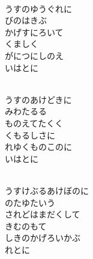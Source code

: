 \documentclass[10pt,b5j]{tarticle} %
\begin{document}
\vspace{1.5em} %
\newcommand{\linespace}{0.5em} %
\newcommand{\blocksize}{0.33\hsize} %
\newcommand{\itemmargin}{3em} %
\begin{enumerate} %
    \setlength{\itemindent}{\itemmargin} %
    \begin{minipage}[c]{\blocksize}
    
        \vspace{\linespace}
        \item~\\
        うすのゆうぐれに\\
        びのはきぶ\\
        かげすにろいて\\
        くましく\\
        がにつにしのえ\\
        いはとに
        
        \vspace{\linespace}
        \item~\\
        うすのあけどきに\\
        みわたるる\\
        ものえてたくく\\
        くもるしさに\\
        れゆくものこのに\\
        いはとに
        
    \end{minipage}
    \begin{minipage}[c]{\blocksize}
        
        \vspace{\linespace}
        \item~\\
        うすけぶるあけぼのに\\
        のたゆたいう\\
        されどはまだくして\\
        きむのもて\\
        しきのかげろいかぶ\\
        れとに
        

\end{minipage}
\end{enumerate}
\end{document}
